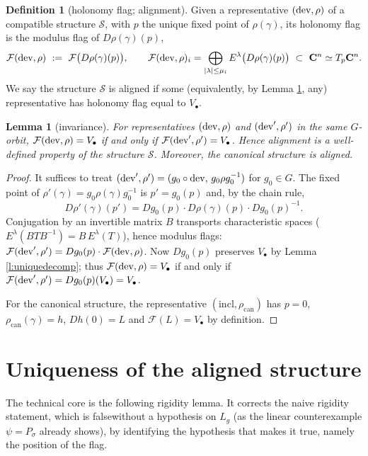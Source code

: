 \documentclass[english,11pt]{amsart}
\newtheorem{lemma}[theorem]{Lemma}
\theoremstyle{definition}
\newtheorem{definition}[theorem]{Definition}
\theoremstyle{remark}
\numberwithin{equation}{section}
\newcommand{\C}{\mathbf{C}}
\newcommand{\FF}{\mathcal{F}}
\newcommand{\dev}{\mathop{\rm dev}\nolimits}
\newcommand{\Sc}{\mathcal{S}}
\begin{document}
\begin{definition}[holonomy flag; alignment]\label{d:aligned}
Given a representative $(\dev,\rho)$ of a compatible structure $\Sc$, with $p$ the unique fixed point of $\rho(\gamma)$, its holonomy flag is the modulus flag of $D\rho(\gamma)(p)$,
\[
\FF(\dev,\rho)\ :=\ \FF\big(D\rho(\gamma)(p)\big),\qquad \FF(\dev,\rho)_i=\bigoplus_{|\lambda|\le\mu_i}E^\lambda\big(D\rho(\gamma)(p)\big)\ \subset\ \C^n\simeq T_p\C^n .
\]
We say the structure $\Sc$ is aligned if some (equivalently, by Lemma \ref{l:aligned-invariant}, any) representative has holonomy flag equal to $V_\bullet$.
\end{definition}

\begin{lemma}[invariance]\label{l:aligned-invariant}
For representatives $(\dev,\rho)$ and $(\dev',\rho')$ in the same $G$-orbit, $\FF(\dev,\rho)=V_\bullet$ if and only if $\FF(\dev',\rho')=V_\bullet$. Hence alignment is a well-defined property of the structure $\Sc$. Moreover, the canonical structure is aligned.
\end{lemma}

\begin{proof}
It suffices to treat $(\dev',\rho')=(g_0\circ\dev,\,g_0\rho g_0^{-1})$ for $g_0\in G$. The fixed point of $\rho'(\gamma)=g_0\rho(\gamma)g_0^{-1}$ is $p'=g_0(p)$ and, by the chain rule,
\[
D\rho'(\gamma)(p')=Dg_0(p)\cdot D\rho(\gamma)(p)\cdot Dg_0(p)^{-1}.
\]
Conjugation by an invertible matrix $B$ transports characteristic spaces ($E^\lambda(BTB^{-1})=B\,E^\lambda(T)$), hence modulus flags: $\FF(\dev',\rho')=Dg_0(p)\cdot\FF(\dev,\rho)$. Now $Dg_0(p)$ preserves $V_\bullet$ by Lemma \ref{l:uniquedecomp}; thus $\FF(\dev,\rho)=V_\bullet$ if and only if $\FF(\dev',\rho')=Dg_0(p)(V_\bullet)=V_\bullet$.

For the canonical structure, the representative $(\mathrm{incl},\rho_{\mathrm{can}})$ has $p=0$, $\rho_{\mathrm{can}}(\gamma)=h$, $Dh(0)=L$ and $\FF(L)=V_\bullet$ by definition.
\end{proof}


\section{Uniqueness of the aligned structure}\label{s:uniqueness}

The technical core is the following rigidity lemma. It corrects the naive rigidity statement, which is falsewithout a hypothesis on $L_g$ (as the linear counterexample $\psi=P_\sigma$ already shows), by identifying the hypothesis that makes it true, namely the position of the flag.
\end{document}
